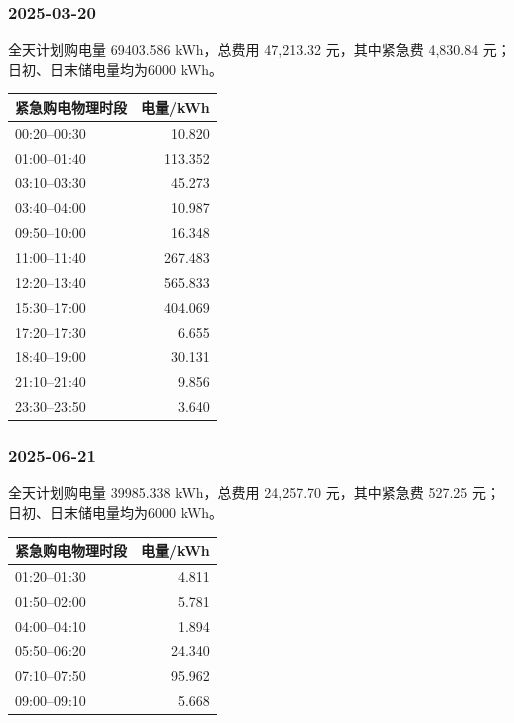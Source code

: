 \subsubsection*{2025-03-20}
\begin{center}\small\quad\end{center}
全天计划购电量 69403.586 kWh，总费用 47,213.32 元，其中紧急费 4,830.84 元；日初、日末储电量均为6000 kWh。
\begin{longtable}{lr}\toprule 紧急购电物理时段 & 电量/kWh\\\midrule\endhead
00:20--00:30 & 10.820 \\
01:00--01:40 & 113.352 \\
03:10--03:30 & 45.273 \\
03:40--04:00 & 10.987 \\
09:50--10:00 & 16.348 \\
11:00--11:40 & 267.483 \\
12:20--13:40 & 565.833 \\
15:30--17:00 & 404.069 \\
17:20--17:30 & 6.655 \\
18:40--19:00 & 30.131 \\
21:10--21:40 & 9.856 \\
23:30--23:50 & 3.640 \\
\bottomrule\end{longtable}
\subsubsection*{2025-06-21}
\begin{center}\small\quad\end{center}
全天计划购电量 39985.338 kWh，总费用 24,257.70 元，其中紧急费 527.25 元；日初、日末储电量均为6000 kWh。
\begin{longtable}{lr}\toprule 紧急购电物理时段 & 电量/kWh\\\midrule\endhead
01:20--01:30 & 4.811 \\
01:50--02:00 & 5.781 \\
04:00--04:10 & 1.894 \\
05:50--06:20 & 24.340 \\
07:10--07:50 & 95.962 \\
09:00--09:10 & 5.668 \\
\bottomrule\end{longtable}
